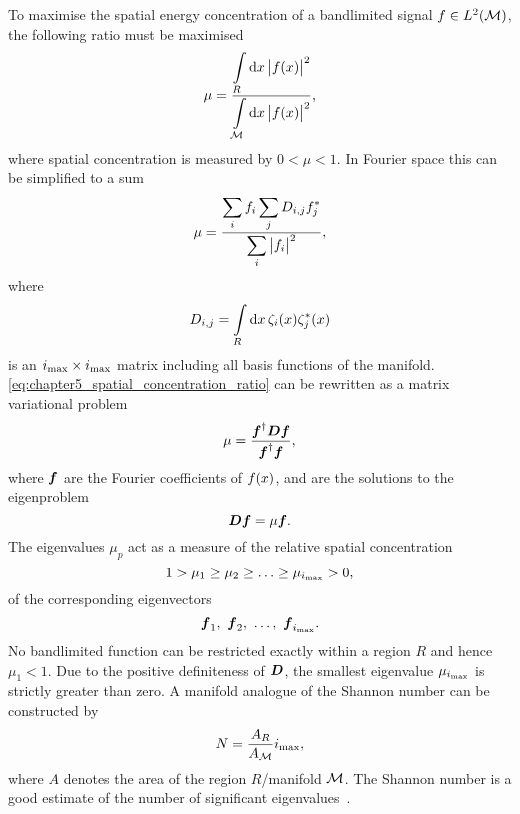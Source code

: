 To maximise the spatial energy concentration of a bandlimited signal \(f \in L^{2}(\mathcal{M})\), the following ratio must be maximised
%
\begin{equation}
	\mu
	= \frac{\displaystyle\int\limits_{R} \dd{x} \big\lvert f(x)\big\rvert^{2}}{\displaystyle\int\limits_{\mathcal{M}} \dd{x} \big\lvert f(x)\big\rvert^{2}},
\end{equation}
%
where spatial concentration is measured by \(0 < \mu < 1\).
In Fourier space this can be simplified to a sum
%
\begin{equation}\label{eq:chapter5_spatial_concentration_ratio}
	\mu
	= \frac{\displaystyle\sum\limits_{i} f_{i} \displaystyle\sum\limits_{j} D_{i,j} f_{j}^{\ast}}{\displaystyle\sum\limits_{i} \big\lvert f_{i}\big\rvert^{2}},
\end{equation}
%
where
%
\begin{equation}
	D_{i,j}
	= \displaystyle\int\limits_{R} \dd{x} \zeta_{i}(x) \zeta_{j}^{\ast}(x)
\end{equation}
%
is an \(i_{\text{max}} \times i_{\text{max}}{}\) matrix including all basis functions of the manifold.
\cref{eq:chapter5_spatial_concentration_ratio} can be rewritten as a matrix variational problem
%
\begin{equation}
	\mu
	= \frac{\vb*{f}^{\dagger} \vb*{D} \vb*{f}}{\vb*{f}^{\dagger} \vb*{f}},
\end{equation}
%
where \(\vb*{f}\) are the Fourier coefficients of \(f(x)\), and are the solutions to the eigenproblem
%
\begin{equation}\label{eq:chapter5_eigenproblem}
	\vb*{D}\vb*{f}
	= \mu \vb*{f}.
\end{equation}
%
The eigenvalues \(\mu_{p}\) act as a measure of the relative spatial concentration
%
\begin{equation}
	1 > \mu_{1} \geq \mu_{2} \geq \ldots \geq \mu_{\imax} > 0, %
\end{equation}
%
of the corresponding eigenvectors
%
\begin{equation}
	\vb*{f}_{1},\ \vb*{f}_{2},\ \ldots,\ \vb*{f}_{i_{\text{max}}}.
\end{equation}
%
No bandlimited function can be restricted exactly within a region \(R\) and hence \(\mu_{1}<1\).
Due to the positive definiteness of \(\vb*{D}\), the smallest eigenvalue \(\mu_{i_{\text{max}}}\) is strictly greater than zero.
A manifold analogue of the Shannon number can be constructed by
%
\begin{equation}\label{eq:chapter5_shannon}
	N
	= \frac{A_{R}}{A_{\mathcal{M}}} i_{\text{max}},
\end{equation}
%
where \(A\) denotes the area of the region \(R\)/manifold \(\mathcal{M}{}\).
The Shannon number is a good estimate of the number of significant eigenvalues~\cite{Percival1993}.

